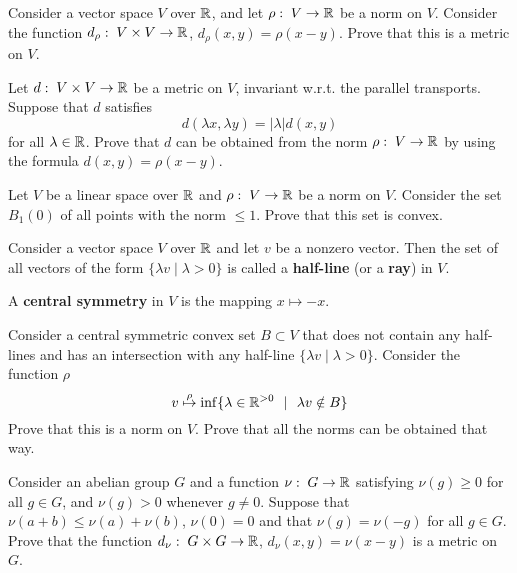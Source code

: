 \documentclass[12pt]{article}
\begin{document}
\begin{zadacha} Consider a vector space $V$ over ${\mathbb R}$, and let
  $\rho:\; V \to {\mathbb R}$ be a norm on $V$.  Consider the function $d_\rho:\;
  V \times V \to {\mathbb R}$, $d_\rho (x, y) = \rho(x-y)$. Prove that this is
  a metric on $V$.
\end{zadacha}

\begin{zadacha}[*] Let $d:\; V \times V \to {\mathbb R}$ be a metric on  $V$,
  invariant w.r.t. the parallel transports. Suppose that $d$ satisfies
$$
d(\lambda x, \lambda y)= |\lambda| d(x,y)
$$
for all $\lambda \in {\mathbb R}$. Prove that $d$ can be obtained from the norm
$\rho:\; V \to {\mathbb R}$ by using the formula $d (x, y) = \rho(x-y)$.
\end{zadacha}

\begin{zadacha} Let $V$ be a linear space over ${\mathbb R}$ and $\rho:\; V \to
  {\mathbb R}$ be a norm on $V$. Consider the set $B_1(0)$ of all points with
  the norm $\leq 1$. Prove that this set is convex.
\end{zadacha}

\begin{opredelenie} Consider a vector space $V$ over ${\mathbb R}$ and let $v$
  be a nonzero vector. Then the set of all vectors of the form $\{
  \lambda v\mid \lambda >0\}$ is called a {\bf half-line} (or a
  {\bf ray}) in $V$.
\end{opredelenie}

\begin{opredelenie} A {\bf central symmetry} in $V$ is the mapping $x
  \mapsto -x$.
\end{opredelenie}

\begin{zadacha}[*] Consider a central symmetric convex set 
$B\subset V$ that does not contain any half-lines and has an
intersection with any half-line $\{
\lambda v\mid \lambda >0\}$. Consider the function $\rho$
$$
v \overset{\rho}{\mapsto} \inf\{\lambda \in {\mathbb R}^{>0}\ \ | \ \ \lambda
v\notin B\}
$$
Prove that this is a norm on $V$. Prove that all the norms can be
obtained that way.
\end{zadacha}

\begin{zadacha} Consider an abelian group $G$ and a function $\nu:\; G
  \to {\mathbb R}$ satisfying $\nu(g)\geq 0$ for all $g\in G$, and $\nu(g)>0$ 
  whenever $g\neq 0$. Suppose that $\nu(a+b) \leq \nu(a) + \nu(b)$, $\nu(0)=0$
  and that $\nu(g) = \nu(-g)$ for all $g\in G$.  Prove that the
  function $d_\nu:\; G \times G \to {\mathbb R}$, $d_\nu(x, y) = \nu (x-y)$ is
  a metric on $G$.
\end{zadacha}
\end{document}
